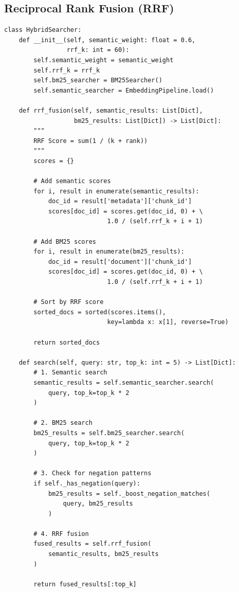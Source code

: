 \documentclass[../DoAn.tex]{subfiles}
\begin{document}
\subsection{Reciprocal Rank Fusion (RRF)}
\begin{verbatim}
class HybridSearcher:
    def __init__(self, semantic_weight: float = 0.6, 
                 rrf_k: int = 60):
        self.semantic_weight = semantic_weight
        self.rrf_k = rrf_k
        self.bm25_searcher = BM25Searcher()
        self.semantic_searcher = EmbeddingPipeline.load()
    
    def rrf_fusion(self, semantic_results: List[Dict], 
                   bm25_results: List[Dict]) -> List[Dict]:
        """
        RRF Score = sum(1 / (k + rank))
        """
        scores = {}
        
        # Add semantic scores
        for i, result in enumerate(semantic_results):
            doc_id = result['metadata']['chunk_id']
            scores[doc_id] = scores.get(doc_id, 0) + \
                            1.0 / (self.rrf_k + i + 1)
        
        # Add BM25 scores
        for i, result in enumerate(bm25_results):
            doc_id = result['document']['chunk_id']
            scores[doc_id] = scores.get(doc_id, 0) + \
                            1.0 / (self.rrf_k + i + 1)
        
        # Sort by RRF score
        sorted_docs = sorted(scores.items(), 
                            key=lambda x: x[1], reverse=True)
        
        return sorted_docs
    
    def search(self, query: str, top_k: int = 5) -> List[Dict]:
        # 1. Semantic search
        semantic_results = self.semantic_searcher.search(
            query, top_k=top_k * 2
        )
        
        # 2. BM25 search
        bm25_results = self.bm25_searcher.search(
            query, top_k=top_k * 2
        )
        
        # 3. Check for negation patterns
        if self._has_negation(query):
            bm25_results = self._boost_negation_matches(
                query, bm25_results
            )
        
        # 4. RRF fusion
        fused_results = self.rrf_fusion(
            semantic_results, bm25_results
        )
        
        return fused_results[:top_k]
\end{verbatim}
\end{document}
